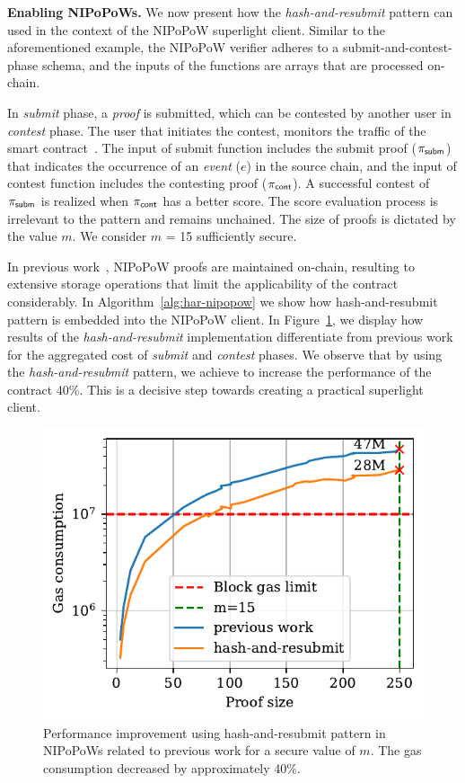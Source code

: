 \noindent \textbf{Enabling NIPoPoWs.} We now present how the
\emph{hash-and-resubmit} pattern can used in the context of the NIPoPoW
superlight client. Similar to the aforementioned example, the NIPoPoW verifier
adheres to a submit-and-contest-phase schema, and the inputs of the functions
are arrays that are processed on-chain.

In \emph{submit} phase, a \emph{proof} is submitted, which can be contested by
another user in \emph{contest} phase. The user that initiates the contest,
monitors the traffic of the smart contract~\cite{nipopows}. The input of
\textsf{submit} function includes the submit proof ($\mathsf{\pi_{subm}}$) that indicates the
occurrence of an \emph{event} ($e$) in the source chain, and the input of
\textsf{contest} function includes the contesting proof ($\mathsf{\pi_{cont}}$). A successful
contest of $\mathsf{\pi_{subm}}$ is realized when $\mathsf{\pi_{cont}}$ has a better score. The score
evaluation process is irrelevant to the pattern and remains unchained. The size
of proofs is dictated by the value $m$. We consider $m$ = 15 sufficiently
secure.

In previous work~\cite{gglou}, NIPoPoW proofs are maintained on-chain,
resulting to extensive storage operations that limit the applicability of the
contract considerably. In Algorithm~\ref{alg:har-nipopow} we show how
hash-and-resubmit pattern is embedded into the NIPoPoW client. In
Figure~\ref{fig:har-nipopow}, we display how results of the
\emph{hash-and-resubmit} implementation differentiate from previous work for
the aggregated cost of \emph{submit} and \emph{contest} phases.  We observe
that by using the \emph{hash-and-resubmit} pattern, we achieve to increase the
performance of the contract 40\%. This is a decisive step towards creating a
practical superlight client.



\begin{figure}[!h]
    \begin{center}
        \includegraphics[width=1\columnwidth]{figures/har-nipopows.pdf}
    \end{center}
    \caption{Performance improvement using hash-and-resubmit pattern in
    NIPoPoWs related to previous work for a secure value of $m$. The gas
    consumption decreased by approximately 40\%.}
    \label{fig:har-nipopow}
\end{figure}
